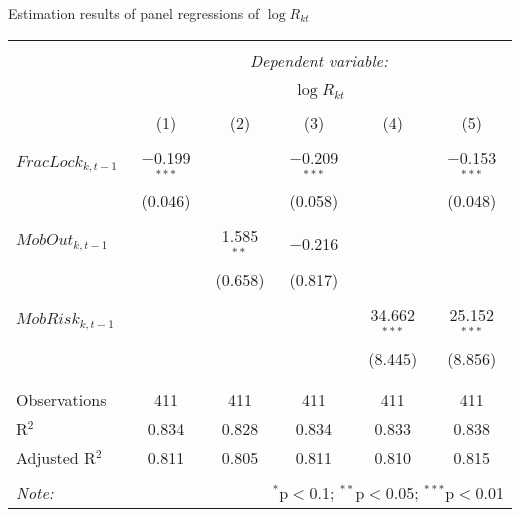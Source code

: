   \caption{Estimation results of panel regressions of $\log R_{kt}$} 
  \label{} 
\small 
\begin{tabular}{@{\extracolsep{5pt}}lccccc} 
\\[-1.8ex]\hline 
\hline \\[-1.8ex] 
 & \multicolumn{5}{c}{\textit{Dependent variable:}} \\ 
\cline{2-6} 
\\[-1.8ex] & \multicolumn{5}{c}{$\log R_{kt}$} \\ 
\\[-1.8ex] & (1) & (2) & (3) & (4) & (5)\\ 
\hline \\[-1.8ex] 
 $FracLock_{k,t-1}$ & $-$0.199$^{***}$ &  & $-$0.209$^{***}$ &  & $-$0.153$^{***}$ \\ 
  & (0.046) &  & (0.058) &  & (0.048) \\ 
  & & & & & \\ 
 $MobOut_{k,t-1}$ &  & 1.585$^{**}$ & $-$0.216 &  &  \\ 
  &  & (0.658) & (0.817) &  &  \\ 
  & & & & & \\ 
 $MobRisk_{k,t-1}$ &  &  &  & 34.662$^{***}$ & 25.152$^{***}$ \\ 
  &  &  &  & (8.445) & (8.856) \\ 
  & & & & & \\ 
\hline \\[-1.8ex] 
Observations & 411 & 411 & 411 & 411 & 411 \\ 
R$^{2}$ & 0.834 & 0.828 & 0.834 & 0.833 & 0.838 \\ 
Adjusted R$^{2}$ & 0.811 & 0.805 & 0.811 & 0.810 & 0.815 \\ 
\hline 
\hline \\[-1.8ex] 
\textit{Note:}  & \multicolumn{5}{r}{$^{*}$p$<$0.1; $^{**}$p$<$0.05; $^{***}$p$<$0.01} \\ 
\end{tabular} 